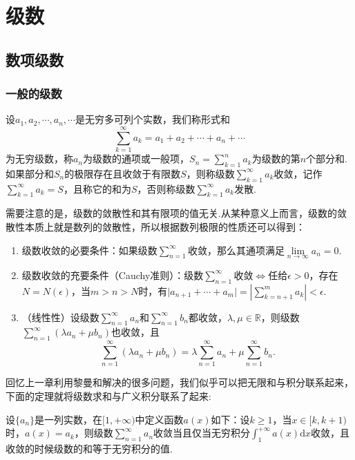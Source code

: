 \chapter{级数}
\section{数项级数}
    \subsection{一般的级数}
    \begin{definition}[级数]

        设\(a_1,a_2,\cdots,a_n,\cdots\)是无穷多可列个实数，我们称形式和\[\sum_{k=1}^{\infty}a_k=a_1+a_2+\cdots+a_n+\cdots\]为无穷级数，称\(a_n\)为级数的通项或一般项，\enspace\(S_n=\sum\limits_{k=1}^{n}a_k\)为级数的第\(n\)个部分和.
        如果部分和\(S_n\)的极限存在且收敛于有限数\(S\)，则称级数\(\sum\limits_{k=1}^{\infty}a_k\)收敛，记作\(\sum\limits_{k=1}^{\infty}a_k=S\)，且称它的和为\(S\)，否则称级数\(\sum\limits_{k=1}^{\infty}a_k\)发散.
    \end{definition}

    需要注意的是，级数的敛散性和其有限项的值无关.从某种意义上而言，级数的敛散性本质上就是数列的敛散性，所以根据数列极限的性质还可以得到：
    \begin{property}
        \begin{enumerate}
            \item 级数收敛的必要条件：如果级数\(\sum\limits_{n=1}^{\infty}\)收敛，那么其通项满足\(\lim\limits_{n\to\infty}a_n=0\).
            \item 级数收敛的充要条件（Cauchy准则）：级数\(\sum\limits_{n=1}^{\infty}\)收敛\(\iff\)任给\(\epsilon>0\)，存在\(N=N(\epsilon)\)，当\(m>n>N\)时，有\(\vert a_{n+1}+\cdots+a_m\vert=\left|\sum\limits_{k=n+1}^{m}a_k\right|<\epsilon\).
            \item （线性性）设级数\(\sum\limits_{n=1}^{\infty}a_n\)和\(\sum\limits_{n=1}^{\infty}b_n\)都收敛，\(\lambda,\mu\in\mathbb{R}\)，则级数\(\sum\limits_{n=1}^{\infty}(\lambda a_n+\mu b_n)\)也收敛，且\[\sum_{n=1}^{\infty}(\lambda a_n+\mu b_n)=\lambda\sum_{n=1}^{\infty}a_n+\mu\sum_{n=1}^{\infty}b_n.\]
        \end{enumerate}
    \end{property}

    回忆上一章利用黎曼和解决的很多问题，我们似乎可以把无限和与积分联系起来，下面的定理就将级数求和与广义积分联系了起来:
    \begin{lemma}
        设\(\{a_n\}\)是一列实数，在\([1,+\infty)\)中定义函数\(a(x)\)如下：设\(k\geq1\)，当\(x\in[k,k+1)\)时，\(a(x)=a_k\)，则级数\(\sum\limits_{n=1}^{\infty}a_n\)收敛当且仅当无穷积分\(\displaystyle\int_{1}^{+\infty}a(x)\mathrm{d}x\)收敛，且收敛的时候级数的和等于无穷积分的值.
    \end{lemma}\

